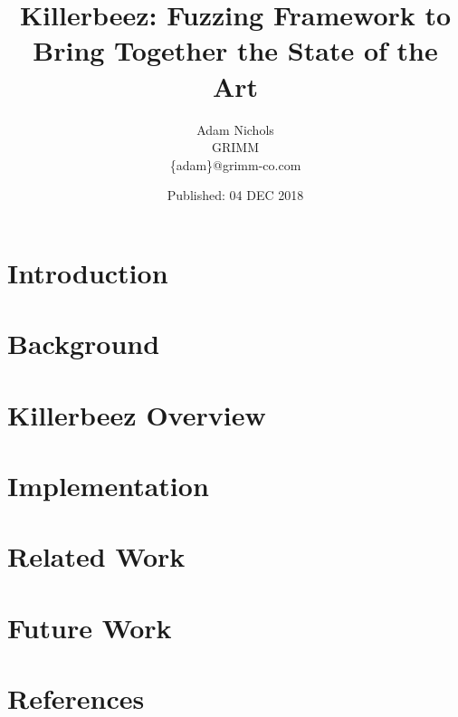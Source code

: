 \documentclass[twocolumn]{article}
\title{Killerbeez: Fuzzing Framework to Bring Together the State of the Art}
\author{Adam Nichols\\
GRIMM\\
\{adam\}@grimm-co.com}
\date{Published: 04 DEC 2018}
\begin{document}
\maketitle




\section{Introduction} \label{Introduction}


\section{Background} \label{Background}


\section{Killerbeez Overview} \label{Killerbeez Overview}


\section{Implementation} \label{Implementation}




\section{Related Work} \label{Related Work}


\section{Future Work} \label{Future Work}


\section{References} \label{References}
\renewcommand{\section}[2]{}  %

\end{document}
